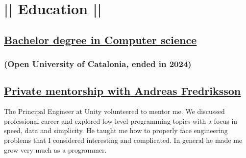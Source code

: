 \section*{|| Education ||}
\subsection*{\underline{Bachelor degree in Computer science}}
\subsubsection*{(Open University of Catalonia, ended in 2024)}
\subsection*{\underline{Private mentorship with Andreas Fredriksson}}
The Principal Engineer at Unity volunteered to mentor me. We discussed professional career and explored low-level programming topics with a focus in speed, data and simplicity. He taught me how to properly face engineering problems that I considered interesting and complicated. In general he made me grow very much as a programmer.
